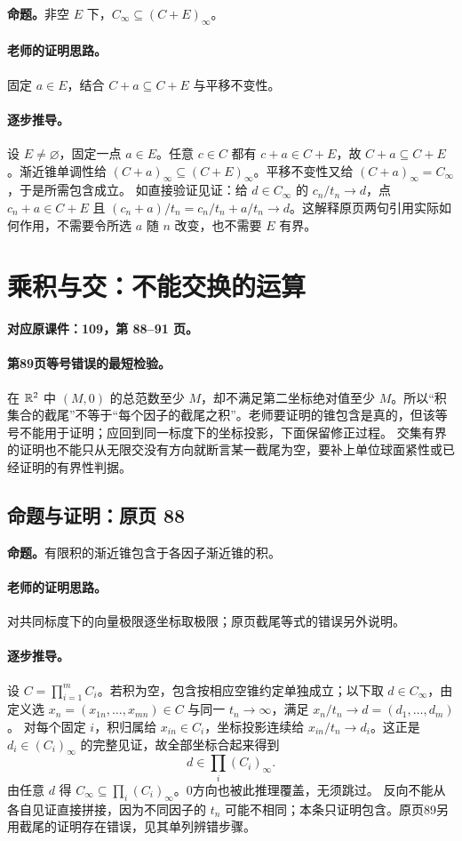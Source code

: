 \textbf{命题。}非空 $E$ 下，$C_\infty\subseteq(C+E)_\infty$。

\paragraph{老师的证明思路。}固定 $a\in E$，结合 $C+a\subseteq C+E$ 与平移不变性。

\paragraph{逐步推导。}
设 $E\ne\varnothing$，固定一点 $a\in E$。任意 $c\in C$ 都有 $c+a\in C+E$，故 $C+a\subseteq C+E$。渐近锥单调性给 $(C+a)_\infty\subseteq(C+E)_\infty$。平移不变性又给 $(C+a)_\infty=C_\infty$，于是所需包含成立。
如直接验证见证：给 $d\in C_\infty$ 的 $c_n/t_n\to d$，点 $c_n+a\in C+E$ 且 $(c_n+a)/t_n=c_n/t_n+a/t_n\to d$。这解释原页两句引用实际如何作用，不需要令所选 $a$ 随 $n$ 改变，也不需要 $E$ 有界。


\clearpage\section{乘积与交：不能交换的运算}\label{g:109:88}

\textbf{对应原课件：109，第 88--91 页。}


\paragraph{第89页等号错误的最短检验。}
在 $\mathbb{R}^2$ 中 $(M,0)$ 的总范数至少 $M$，却不满足第二坐标绝对值至少 $M$。所以“积集合的截尾”不等于“每个因子的截尾之积”。老师要证明的锥包含是真的，但该等号不能用于证明；应回到同一标度下的坐标投影，下面保留修正过程。
交集有界的证明也不能只从无限交没有方向就断言某一截尾为空，要补上单位球面紧性或已经证明的有界性判据。


\subsection{命题与证明：原页 88}

\textbf{命题。}有限积的渐近锥包含于各因子渐近锥的积。

\paragraph{老师的证明思路。}对共同标度下的向量极限逐坐标取极限；原页截尾等式的错误另外说明。

\paragraph{逐步推导。}
设 $C=\prod_{i=1}^mC_i$。若积为空，包含按相应空锥约定单独成立；以下取 $d\in C_\infty$，由定义选 $x_n=(x_{1n},\ldots,x_{mn})\in C$ 与同一 $t_n\to\infty$，满足 $x_n/t_n\to d=(d_1,\ldots,d_m)$。
对每个固定 $i$，积归属给 $x_{in}\in C_i$，坐标投影连续给 $x_{in}/t_n\to d_i$。这正是 $d_i\in(C_i)_\infty$ 的完整见证，故全部坐标合起来得到
\[d\in\prod_i(C_i)_\infty.\]
由任意 $d$ 得 $C_\infty\subseteq\prod_i(C_i)_\infty$。0方向也被此推理覆盖，无须跳过。
反向不能从各自见证直接拼接，因为不同因子的 $t_n$ 可能不相同；本条只证明包含。原页89另用截尾的证明存在错误，见其单列辨错步骤。


